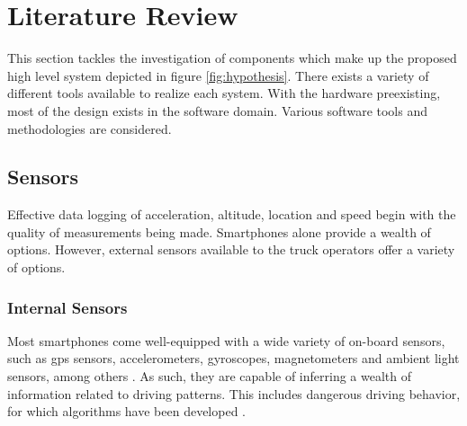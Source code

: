 \section{Literature Review}
This section tackles the investigation of components which make up the proposed high level system depicted in figure \ref{fig:hypothesis}.
There exists a variety of different tools available to realize each system.
With the hardware preexisting, most of the design exists in the software domain.
Various software tools and methodologies are considered.

\subsection{Sensors}
Effective data logging of acceleration, altitude, location and speed begin with the quality of measurements being made.
Smartphones alone provide a wealth of options.
However, external sensors available to the truck operators offer a variety of options.

\subsubsection{Internal Sensors}
Most smartphones come well-equipped with a wide variety of on-board sensors, such as \ac{gps} sensors, accelerometers, gyroscopes, magnetometers and ambient light sensors, among others \cite{majumder2019smartphone}.
As such, they are capable of inferring a wealth of information related to driving patterns.
This includes dangerous driving behavior, for which algorithms have been developed \cite{li2016dangerous}.

